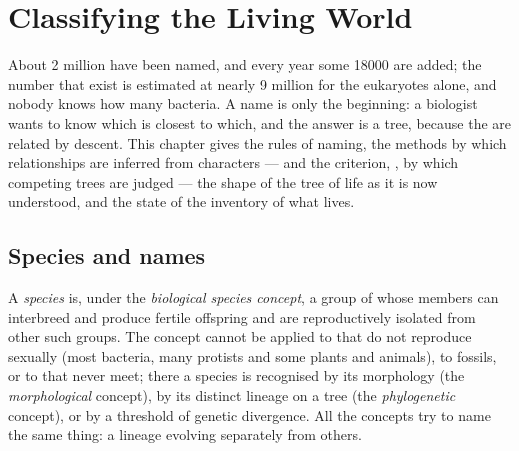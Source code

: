 \chapter{Classifying the Living World}\label{ch:b1:classifying-biodiversity}

About \num{2} million  have been named, and every year some
\num{18000} are added; the number that exist is estimated at nearly
\num{9} million for the eukaryotes alone, and nobody knows how many
bacteria. A name is only the beginning: a biologist wants to know
which  is closest to which, and the answer is a tree, because
the  are related by descent. This chapter gives the rules of
naming, the methods by which relationships are inferred from
characters --- and the criterion, , by which competing trees
are judged --- the shape of the tree of life as it is now understood,
and the state of the inventory of what lives.

\section{Species and names}

\begin{definition}[Species]\label{def:b1:classifying-biodiversity:species}
A \emph{species} is, under the \emph{biological species concept}, a
group of  whose members can interbreed and produce fertile
offspring and are reproductively isolated from other such groups.
The concept cannot be applied to  that do not reproduce
sexually (most bacteria, many protists and some plants and animals),
to fossils, or to  that never meet; there a species is
recognised by its morphology (the \emph{morphological} concept), by
its distinct lineage on a tree (the \emph{phylogenetic} concept), or
by a threshold of genetic divergence. All the concepts try to name the
same thing: a lineage evolving separately from others.
\end{definition}

